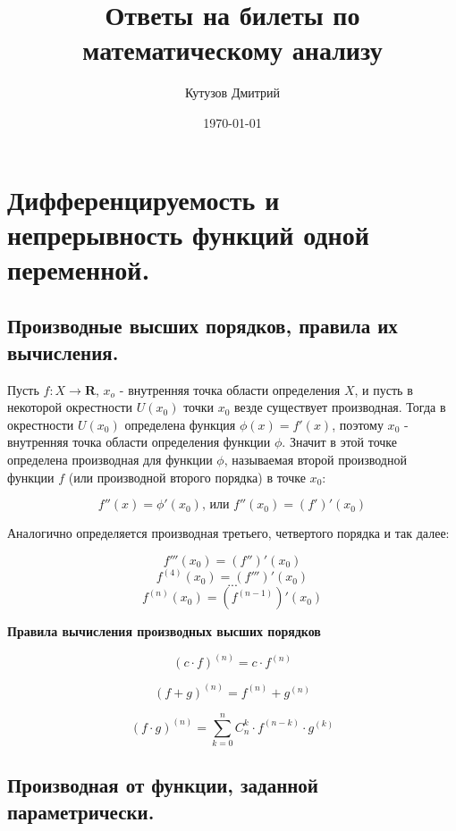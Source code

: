 \documentclass[a4paper,12pt]{article}
\author{Кутузов Дмитрий}
\title{Ответы на билеты по математическому анализу}
\date{\today}
\theoremstyle{plain} %
\theoremstyle{definition} %
\theoremstyle{remark} %
\begin{document}

\maketitle

{
	\hypersetup{linkcolor=black}
	\tableofcontents
	\newpage
}


\section*{Дифференцируемость и непрерывность функций одной переменной.}


\subsection*{Производные высших порядков, правила их вычисления.}

Пусть $f: X \rightarrow \mathbf{R}$, $x_o$ - внутренняя точка области определения $X$, и пусть в некоторой окрестности $U(x_0)$ точки $x_0$ везде существует производная. Тогда в окрестности $U(x_0)$ определена функция $\phi(x) = f'(x)$, поэтому $x_0$ - внутренняя точка области определения функции $\phi$. Значит в этой точке определена производная для функции $\phi$, называемая второй производной функции $f$ (или производной второго порядка) в точке $x_0$:

\[
	f''(x) = \phi'(x_0) \text{, или } f''(x_0) = (f')'(x_0)
\]

Аналогично определяется производная третьего, четвертого порядка и так далее:

\[
	f'''(x_0) = (f'')'(x_0)
\]
\[
	f^{(4)}(x_0) = (f''')'(x_0)
\]
\[
	...
\]
\[
	f^{(n)}(x_0) = (f^{(n-1)})'(x_0)
\]

\textbf{Правила вычисления производных высших порядков}

\[
	(c \cdot f)^{(n)} = c \cdot f^{(n)}
\]

\[
	(f + g)^{(n)} = f^{(n)} + g^{(n)}
\]

\[
	(f \cdot g)^{(n)} = \sum_{k = 0}^{n} C_n^k \cdot f^{(n-k)} \cdot g^{(k)}
\]


\newpage
\subsection*{Производная от функции, заданной параметрически.}
\end{document}
